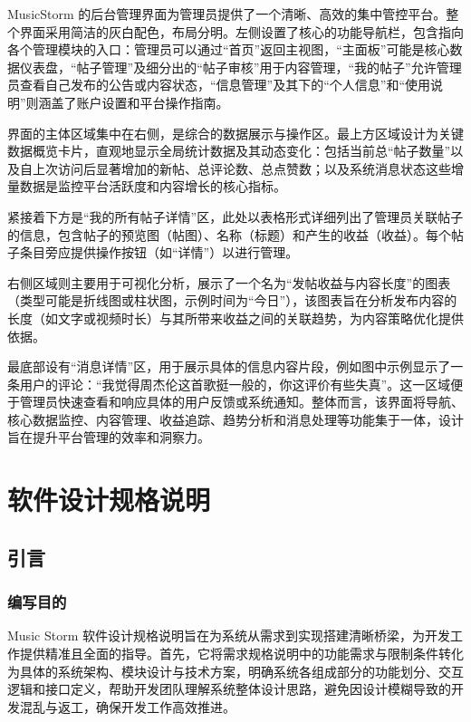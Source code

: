 \documentclass{base}
\begin{document}
MusicStorm 的后台管理界面为管理员提供了一个清晰、高效的集中管控平台。整个界面采用简洁的灰白配色，布局分明。左侧设置了核心的功能导航栏，包含指向各个管理模块的入口：管理员可以通过“首页”返回主视图，“主面板”可能是核心数据仪表盘，“帖子管理”及细分出的“帖子审核”用于内容管理，“我的帖子”允许管理员查看自己发布的公告或内容状态，“信息管理”及其下的“个人信息”和“使用说明”则涵盖了账户设置和平台操作指南。

界面的主体区域集中在右侧，是综合的数据展示与操作区。最上方区域设计为关键数据概览卡片，直观地显示全局统计数据及其动态变化：包括当前总“帖子数量”以及自上次访问后显著增加的新帖、总评论数、总点赞数；以及系统消息状态这些增量数据是监控平台活跃度和内容增长的核心指标。

紧接着下方是“我的所有帖子详情”区，此处以表格形式详细列出了管理员关联帖子的信息，包含帖子的预览图（帖图）、名称（标题）和产生的收益（收益）。每个帖子条目旁应提供操作按钮（如“详情”）以进行管理。

​​右侧区域则主要用于可视化分析​​，展示了一个名为“发帖收益与内容长度”的图表（类型可能是折线图或柱状图，示例时间为“今日”），该图表旨在分析发布内容的长度（如文字或视频时长）与其所带来收益之间的关联趋势，为内容策略优化提供依据。

​​最底部设有“消息详情”区​​，用于展示具体的信息内容片段，例如图中示例显示了一条用户的评论：“我觉得周杰伦这首歌挺一般的，你这评价有些失真”。这一区域便于管理员快速查看和响应具体的用户反馈或系统通知。整体而言，该界面将导航、核心数据监控、内容管理、收益追踪、趋势分析和消息处理等功能集于一体，设计旨在提升平台管理的效率和洞察力。

\section{软件设计规格说明}

\subsection{引言}

\subsubsection{编写目的}

Music Storm 软件设计规格说明旨在为系统从需求到实现搭建清晰桥梁，为开发工作提供精准且全面的指导。首先，它将需求规格说明中的功能需求与限制条件转化为具体的系统架构、模块设计与技术方案，明确系统各组成部分的功能划分、交互逻辑和接口定义，帮助开发团队理解系统整体设计思路，避免因设计模糊导致的开发混乱与返工，确保开发工作高效推进。
\end{document}
